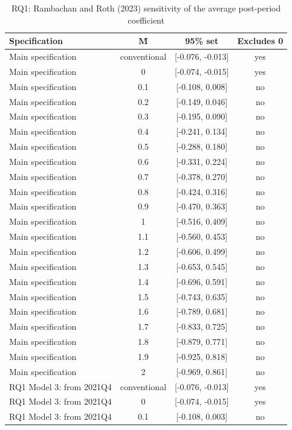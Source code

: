 \begin{table}[htbp]\centering
\caption{RQ1: Rambachan and Roth (2023) sensitivity of the average post-period coefficient}
\begin{tabular}{lccc}
\toprule
Specification & M̄ & 95\% set & Excludes 0 \\
\midrule
Main specification & conventional & [-0.076, -0.013] & yes \\
Main specification & 0 & [-0.074, -0.015] & yes \\
Main specification & 0.1 & [-0.108, 0.008] & no \\
Main specification & 0.2 & [-0.149, 0.046] & no \\
Main specification & 0.3 & [-0.195, 0.090] & no \\
Main specification & 0.4 & [-0.241, 0.134] & no \\
Main specification & 0.5 & [-0.288, 0.180] & no \\
Main specification & 0.6 & [-0.331, 0.224] & no \\
Main specification & 0.7 & [-0.378, 0.270] & no \\
Main specification & 0.8 & [-0.424, 0.316] & no \\
Main specification & 0.9 & [-0.470, 0.363] & no \\
Main specification & 1 & [-0.516, 0.409] & no \\
Main specification & 1.1 & [-0.560, 0.453] & no \\
Main specification & 1.2 & [-0.606, 0.499] & no \\
Main specification & 1.3 & [-0.653, 0.545] & no \\
Main specification & 1.4 & [-0.696, 0.591] & no \\
Main specification & 1.5 & [-0.743, 0.635] & no \\
Main specification & 1.6 & [-0.789, 0.681] & no \\
Main specification & 1.7 & [-0.833, 0.725] & no \\
Main specification & 1.8 & [-0.879, 0.771] & no \\
Main specification & 1.9 & [-0.925, 0.818] & no \\
Main specification & 2 & [-0.969, 0.861] & no \\
RQ1 Model 3: from 2021Q4 & conventional & [-0.076, -0.013] & yes \\
RQ1 Model 3: from 2021Q4 & 0 & [-0.074, -0.015] & yes \\
RQ1 Model 3: from 2021Q4 & 0.1 & [-0.108, 0.003] & no \\

\end{tabular}
\end{table}
